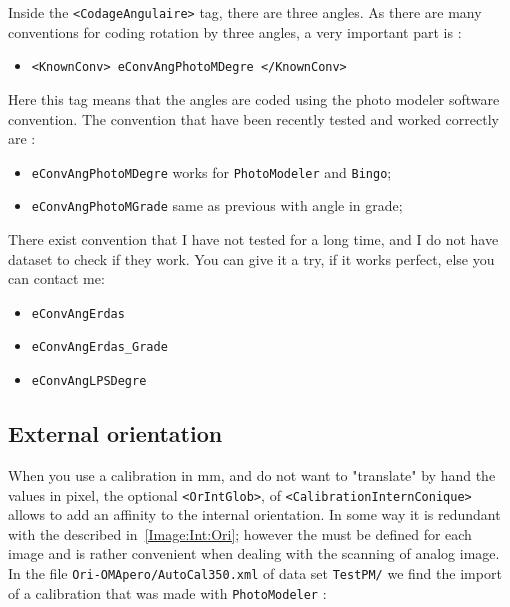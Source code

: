 Inside the {\tt  <CodageAngulaire>} tag, there are three angles. As there are many
conventions for coding rotation by three angles, a very important part is :

\begin{itemize}
      \item {\tt <KnownConv> eConvAngPhotoMDegre </KnownConv>}
\end{itemize}

Here this tag means that the angles are coded using the photo modeler software convention.
The convention that have been recently tested and worked correctly are :

\begin{itemize}
      \item {\tt eConvAngPhotoMDegre}  works for {\tt PhotoModeler} and {\tt Bingo};
      \item {\tt eConvAngPhotoMGrade}  same as previous with angle in grade;
\end{itemize}

There exist convention that I have not tested for a long time, and I do not have dataset to
check if they work. You can give it a try, if it works perfect, else you can contact me:

\begin{itemize}
    \item {\tt eConvAngErdas}
    \item {\tt eConvAngErdas\_Grade}
    \item {\tt eConvAngLPSDegre}
\end{itemize}


\subsection{External orientation}

When you use a calibration in mm, and do not want to "translate" by hand the values
in pixel, the optional {\tt <OrIntGlob>},  of {\tt <CalibrationInternConique>} allows
to add an affinity to the internal orientation. In some way it is redundant with the 
{\tt <OrIntImaM2C>} described in~\ref{Image:Int:Ori}; however the {\tt <OrIntImaM2C>} 
must be defined for each image and is rather convenient when dealing with the 
scanning of analog image. In the file {\tt  Ori-OMApero/AutoCal350.xml} of  data set
{\tt TestPM/}  we find the import of a calibration that was made with {\tt PhotoModeler} :

